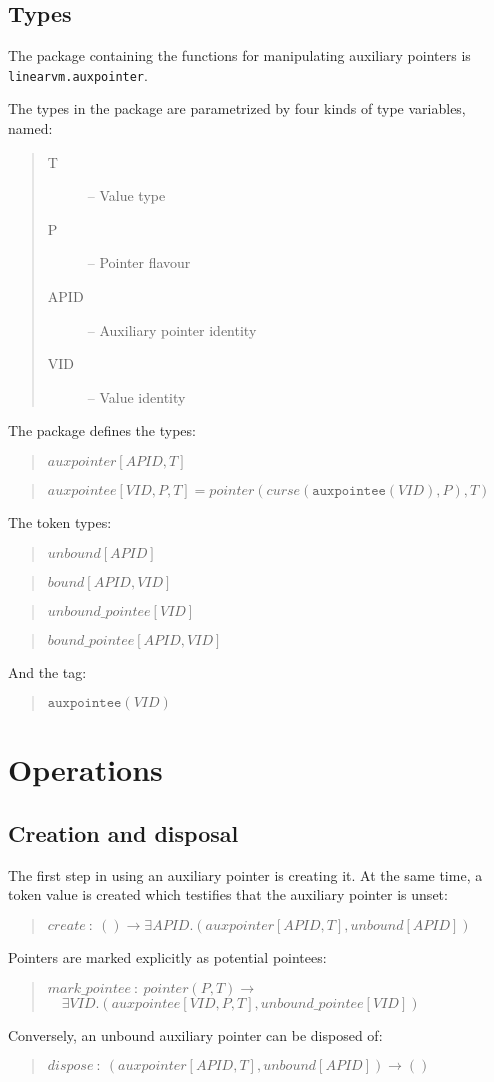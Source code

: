 \documentclass[a4paper]{book}
\newcommand\TypeDefinition[1]{\begin{quote}$\mathit{#1}$\end{quote}}
\newcommand\FuncSignature[2]{\begin{quote}$\mathit{#1}\ :\ \mathit{#2}$\end{quote}}
\newcommand\FuncSignatureII[3]{\begin{quote}$\mathit{#1}\ :\ \mathit{#2} \to$\\${}\quad \mathit{#3}$ \end{quote}}
\newcommand\TagDefinitionII[2]{\begin{quote}$\mathtt{#1}(\mathit{#2})$\end{quote}}
\begin{document}
\subsection*{Types}
The package containing the functions for manipulating auxiliary pointers is
\texttt{linearvm.auxpointer}.

\smallskip
The types in the package are parametrized by four kinds of type variables, named:
\begin{quote}
\begin{description}
\item[T] -- Value type
\item[P] -- Pointer flavour
\item[APID] -- Auxiliary pointer identity
\item[VID] -- Value identity
\end{description}
\end{quote}


\smallskip
\noindent
The package defines the types:

\TypeDefinition{auxpointer[APID,T]}
\TypeDefinition{auxpointee[VID,P,T] = pointer(curse(\texttt{auxpointee}(VID),P),T)}

\noindent
The token types:

\TypeDefinition{unbound[APID]}
\TypeDefinition{bound[APID,VID]}
\TypeDefinition{unbound\_pointee[VID]}
\TypeDefinition{bound\_pointee[APID,VID]}

\noindent
And the tag:
\TagDefinitionII{auxpointee}{VID}


\section*{Operations}

\subsection*{Creation and disposal}
The first step in using an auxiliary pointer is creating it.
At the same time, a token value is created which testifies that the
auxiliary pointer is unset:
\FuncSignature{create}{() \to \exists APID.(auxpointer[APID,T], unbound[APID])}

\noindent
Pointers are marked explicitly as potential pointees:
\FuncSignatureII{mark\_pointee}
{pointer(P,T)}
{\exists VID.(auxpointee[VID,P,T], unbound\_pointee[VID])
}

\noindent
Conversely, an unbound auxiliary pointer can be disposed of:
\FuncSignature{dispose}{(auxpointer[APID,T], unbound[APID]) \to ()}
\end{document}
